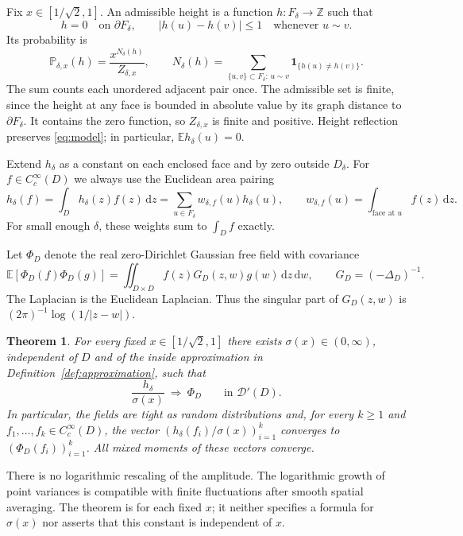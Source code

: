 \documentclass[11pt]{article}
\newcommand{\Z}{\mathbb Z}
\newcommand{\E}{\mathbb E}
\newcommand{\Prob}{\mathbb P}
\newcommand{\ind}{\mathbf 1}
\newcommand{\dd}{\,\mathrm d}
\newtheorem{theorem}{Theorem}[section]
\theoremstyle{definition}
\theoremstyle{remark}
\numberwithin{equation}{section}
\begin{document}
Fix $x\in[1/\sqrt2,1]$.  An admissible height is a function
$h:F_\delta\to\Z$ such that
\[
 h=0\quad\text{on }\partial F_\delta,
 \qquad |h(u)-h(v)|\le1\quad\text{whenever }u\sim v.
\]
Its probability is
\begin{equation}\label{eq:model}
 \Prob_{\delta,x}(h)=\frac{x^{N_\delta(h)}}{Z_{\delta,x}},
 \qquad
 N_\delta(h)=\sum_{\{u,v\}\subset F_\delta:\,u\sim v}
                 \ind_{\{h(u)\ne h(v)\}}.
\end{equation}
The sum counts each unordered adjacent pair once.  The admissible set is
finite, since the height at any face is bounded in absolute value by its
graph distance to $\partial F_\delta$.  It contains the zero function, so
$Z_{\delta,x}$ is finite and positive.  Height reflection preserves
\eqref{eq:model}; in particular, $\E h_\delta(u)=0$.

Extend $h_\delta$ as a constant on each enclosed face and by zero outside
$D_\delta$.  For $f\in C_c^\infty(D)$ we always use the Euclidean area
pairing
\begin{equation}\label{eq:area-pairing}
 h_\delta(f)=\int_D h_\delta(z)f(z)\dd z
 =\sum_{u\in F_\delta} w_{\delta,f}(u)h_\delta(u),
 \qquad w_{\delta,f}(u)=\int_{\text{face at }u}f(z)\dd z.
\end{equation}
For small enough $\delta$, these weights sum to $\int_D f$ exactly.

Let $\Phi_D$ denote the real zero-Dirichlet Gaussian free field with
covariance
\begin{equation}\label{eq:gff-covariance}
 \E[\Phi_D(f)\Phi_D(g)]
 =\iint_{D\times D} f(z)G_D(z,w)g(w)\dd z\dd w,
 \qquad G_D=(-\Delta_D)^{-1}.
\end{equation}
The Laplacian is the Euclidean Laplacian.  Thus the singular part of
$G_D(z,w)$ is $(2\pi)^{-1}\log(1/|z-w|)$.

\begin{theorem}\label{thm:main}
For every fixed $x\in[1/\sqrt2,1]$ there exists
$\sigma(x)\in(0,\infty)$, independent of $D$ and of the inside approximation
in Definition~\ref{def:approximation}, such that
\[
 \frac{h_\delta}{\sigma(x)}\ \Longrightarrow\ \Phi_D
 \qquad\text{in }\mathcal D'(D).
\]
In particular, the fields are tight as random distributions and, for every
$k\ge1$ and $f_1,\ldots,f_k\in C_c^\infty(D)$, the vector
$(h_\delta(f_i)/\sigma(x))_{i=1}^k$ converges to
$(\Phi_D(f_i))_{i=1}^k$.  All mixed moments of these vectors converge.
\end{theorem}

There is no logarithmic rescaling of the amplitude.  The logarithmic growth
of point variances \cite[Section~1.2.4]{GL2025} is compatible with finite fluctuations after smooth
spatial averaging.  The theorem is for each fixed $x$; it neither specifies
a formula for $\sigma(x)$ nor asserts that this constant is independent of
$x$.
\end{document}
